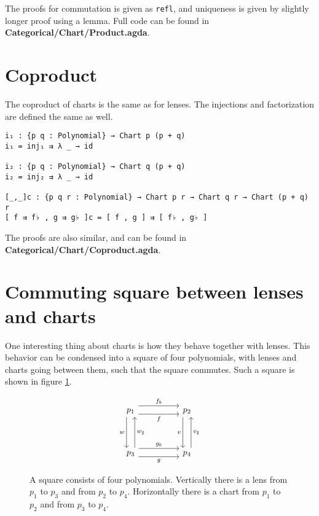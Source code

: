 The proofs for commutation is given as \texttt{refl}, and uniqueness is given by slightly longer proof using a lemma. Full code can be found in \textbf{Categorical/Chart/Product.agda}.


\section{Coproduct}
The coproduct of charts is the same as for lenses. The injections and factorization are defined the same as well.
\begin{verbatim}
i₁ : {p q : Polynomial} → Chart p (p + q)
i₁ = inj₁ ⇉ λ _ → id

i₂ : {p q : Polynomial} → Chart q (p + q)
i₂ = inj₂ ⇉ λ _ → id

[_,_]c : {p q r : Polynomial} → Chart p r → Chart q r → Chart (p + q) r
[ f ⇉ f♭ , g ⇉ g♭ ]c = [ f , g ] ⇉ [ f♭ , g♭ ]
\end{verbatim}

The proofs are also similar, and can be found in \textbf{Categorical/Chart/Coproduct.agda}.

\section{Commuting square between lenses and charts}
One interesting thing about charts is how they behave together with lenses. This behavior can be condensed into a square of four polynomials, with lenses and charts going between them, such that the square commutes. Such a square is shown in figure \ref{fig:commutingSquare}.


\begin{figure}[H]
    \centering
\[\begin{tikzcd}
	{p_1} && {p_2} \\
	\\
	{p_3} && {p_4}
	\arrow["g"', shift right=2, from=3-1, to=3-3]
	\arrow["f"', shift right=2, from=1-1, to=1-3]
	\arrow["{w_\sharp}"', shift right=2, from=3-1, to=1-1]
	\arrow["v"', shift right=2, from=1-3, to=3-3]
	\arrow["{v_\sharp}"', shift right=2, from=3-3, to=1-3]
	\arrow["{f_b}", shift left=2, from=1-1, to=1-3]
	\arrow["{g_b}", shift left=2, from=3-1, to=3-3]
	\arrow["w"', shift right=2, from=1-1, to=3-1]
\end{tikzcd}\]
    
    \caption{A square consists of four polynomials. Vertically there is a lens from $p_1$ to $p_3$ and from $p_2$ to $p_4$. Horizontally there is a chart from $p_1$ to $p_2$ and from $p_3$ to $p_4$. }
    \label{fig:commutingSquare}
\end{figure}


